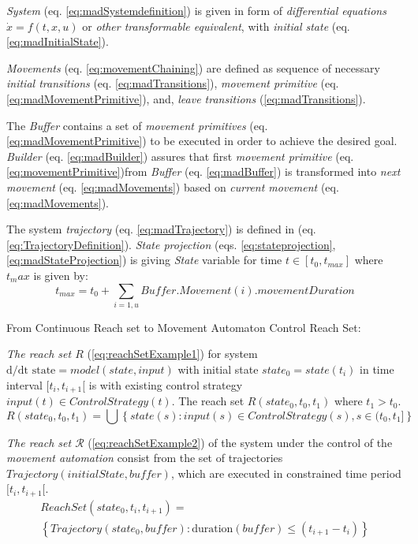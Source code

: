 \begin{definition}
    \noindent \emph{System} (eq. \ref{eq:madSystemdefinition}) is given in form of \emph{differential equations} $\dot{x} = f(t,x,u)$ or \emph{other transformable equivalent}, with \emph{initial state} (eq. \ref{eq:madInitialState}).
    
    \emph{Movements} (eq. \ref{eq:movementChaining}) are defined as sequence of necessary \emph{initial transitions} (eq. \ref{eq:madTransitions}), \emph{movement primitive} (eq. \ref{eq:madMovementPrimitive}), and, \emph{leave transitions} (\ref{eq:madTransitions}).
    
    The \emph{Buffer} contains a set of \emph{movement primitives} (eq. \ref{eq:madMovementPrimitive}) to be executed in order to achieve the desired goal. \emph{Builder} (eq. \ref{eq:madBuilder}) assures that first \emph{movement primitive} (eq. \ref{eq:movementPrimitive})from \emph{Buffer} (eq. \ref{eq:madBuffer}) is transformed into \emph{next movement} (eq. \ref{eq:madMovements}) based on \emph{current movement} (eq.\ref{eq:madMovements}).
    
    \noindent The system \emph{trajectory} (eq. \ref{eq:madTrajectory}) is defined in (eq. \ref{eq:TrajectoryDefinition}). \emph{State projection} (eqs. \ref{eq:stateprojection},\ref{eq:madStateProjection}) is giving \emph{State} variable for time $t\in[t_0,t_{max}]$ where $t_max$ is given by:
    \begin{equation}
    t_{max}=t_0+\sum_{i=1,u}Buffer.Movement(i).movementDuration    
    \end{equation}
    \end{definition}
    
    \begin{note}{From Continuous Reach set to Movement Automaton Control Reach Set:}\label{eq:fromContRStoMARS}

\emph{The reach set $R$} (\ref{eq:reachSetExample1}) for system $\text{d}/\text{d} \text{t state} =model(state,input)$ with initial state $state_0=state(t_i)$ in time interval $[t_i,t_{i+1}[$  is with existing control strategy $input(t)\in Control Strategy(t)$. The reach set $R(state_0, t_0,t_1)$ where $t_1 > t_0$.
\begin{equation}\label{eq:reachSetExample1}
    R(state_0, t_0,t_1) = \bigcup \left\{state(s):input(s)\in Control Strategy(s), s\in (t_0,t_1]\right\} 
\end{equation}


\noindent\emph{The reach set $\mathscr{R}$} (\ref{eq:reachSetExample2}) of the system under the control of the \emph{movement automation} consist from the set of trajectories $Trajectory(initialState,buffer)$, which are executed in constrained time period $[t_i,t_{i+1}[$.
\begin{multline}\label{eq:reachSetExample2}
     ReachSet(state_0,t_i,t_{i+1})=\\\left\{Trajectory(state_0,buffer):\text{duration}(buffer) \le (t_{i+1}-t_i)\right\}
\end{multline}
\end{note}

